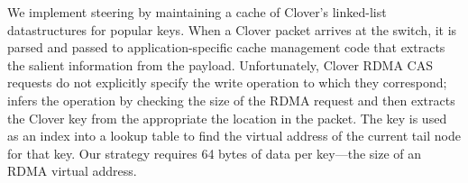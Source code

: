 We implement steering by maintaining a cache of Clover's
linked-list datastructures for popular keys.  %
When a Clover packet arrives at the switch, it is parsed and passed to
application-specific cache management code that extracts the
salient information from the payload.
Unfortunately, Clover RDMA CAS requests do not explicitly specify the
write operation to which they correspond; {\sword} infers the
operation by checking the size of the RDMA request and then extracts
the Clover key from the appropriate the location in the packet.  The
key is used as an index into a lookup table to find the virtual
address of the current tail node for that key.  Our strategy requires
64 bytes of data per key---the size of an RDMA virtual address.









